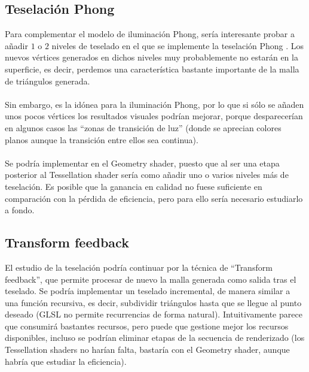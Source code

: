 \subsection*{Teselación Phong}
Para complementar el modelo de iluminación Phong, sería interesante probar a añadir $1$ o $2$ niveles de teselado en el que se implemente la teselación Phong \cite{PhongTess}. Los nuevos vértices generados en dichos niveles muy probablemente no estarán en la superficie, es decir, perdemos una característica bastante importante de la malla de triángulos generada.\\
\\Sin embargo, es la idónea para la iluminación Phong, por lo que si sólo se añaden unos pocos vértices los resultados visuales podrían mejorar, porque desparecerían en algunos casos las ``zonas de transición de luz'' (donde se aprecian colores planos aunque la transición entre ellos sea continua).\\
\\Se podría implementar en el Geometry shader, puesto que al ser una etapa posterior al Tessellation shader sería como añadir uno o varios niveles más de teselación. Es posible que la ganancia en calidad no fuese suficiente en comparación con la pérdida de eficiencia, pero para ello sería necesario estudiarlo a fondo.\\

\subsection*{Transform feedback}
El estudio de la teselación podría continuar por la técnica de ``Transform feedback'', que permite procesar de nuevo la malla generada como salida tras el teselado. Se podría implementar un teselado incremental, de manera similar a una función recursiva, es decir, subdividir triángulos hasta que se llegue al punto deseado (GLSL no permite recurrencias de forma natural). Intuitivamente parece que consumirá bastantes recursos, pero puede que gestione mejor los recursos disponibles, incluso se podrían eliminar etapas de la secuencia de renderizado (los Tessellation shaders no harían falta, bastaría con el Geometry shader, aunque habría que estudiar la eficiencia).\\

